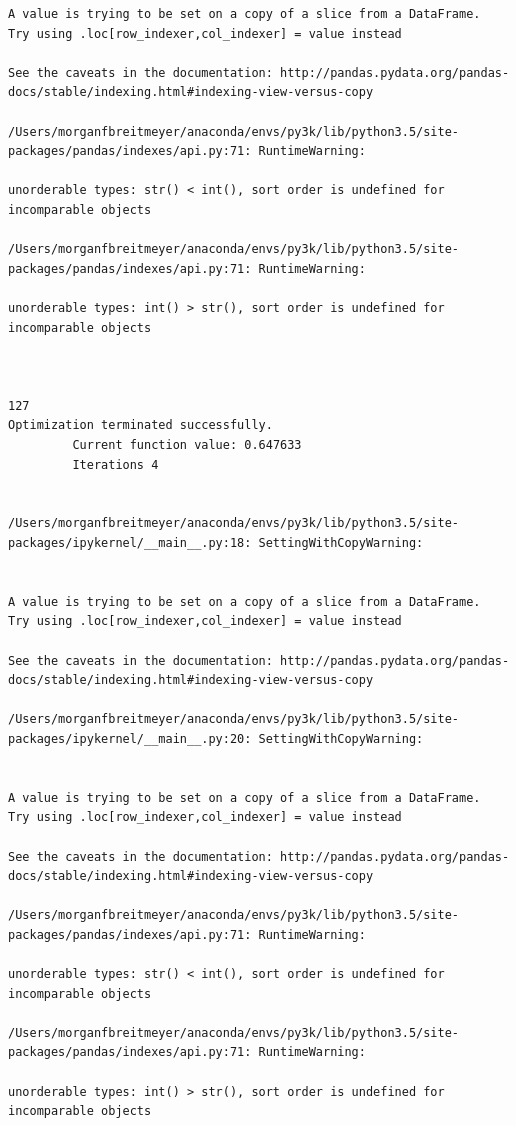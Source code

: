 \begin{lstlisting}
A value is trying to be set on a copy of a slice from a DataFrame.
Try using .loc[row_indexer,col_indexer] = value instead

See the caveats in the documentation: http://pandas.pydata.org/pandas-docs/stable/indexing.html#indexing-view-versus-copy

/Users/morganfbreitmeyer/anaconda/envs/py3k/lib/python3.5/site-packages/pandas/indexes/api.py:71: RuntimeWarning:

unorderable types: str() < int(), sort order is undefined for incomparable objects

/Users/morganfbreitmeyer/anaconda/envs/py3k/lib/python3.5/site-packages/pandas/indexes/api.py:71: RuntimeWarning:

unorderable types: int() > str(), sort order is undefined for incomparable objects



127
Optimization terminated successfully.
         Current function value: 0.647633
         Iterations 4


/Users/morganfbreitmeyer/anaconda/envs/py3k/lib/python3.5/site-packages/ipykernel/__main__.py:18: SettingWithCopyWarning:


A value is trying to be set on a copy of a slice from a DataFrame.
Try using .loc[row_indexer,col_indexer] = value instead

See the caveats in the documentation: http://pandas.pydata.org/pandas-docs/stable/indexing.html#indexing-view-versus-copy

/Users/morganfbreitmeyer/anaconda/envs/py3k/lib/python3.5/site-packages/ipykernel/__main__.py:20: SettingWithCopyWarning:


A value is trying to be set on a copy of a slice from a DataFrame.
Try using .loc[row_indexer,col_indexer] = value instead

See the caveats in the documentation: http://pandas.pydata.org/pandas-docs/stable/indexing.html#indexing-view-versus-copy

/Users/morganfbreitmeyer/anaconda/envs/py3k/lib/python3.5/site-packages/pandas/indexes/api.py:71: RuntimeWarning:

unorderable types: str() < int(), sort order is undefined for incomparable objects

/Users/morganfbreitmeyer/anaconda/envs/py3k/lib/python3.5/site-packages/pandas/indexes/api.py:71: RuntimeWarning:

unorderable types: int() > str(), sort order is undefined for incomparable objects




\end{lstlisting}
